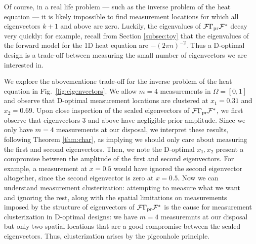 \documentclass[ba]{imsart}
\newcommand{\fwd}{\mathcal{F}}
\theoremstyle{plain}
\theoremstyle{definition}
\theoremstyle{remark}
\begin{document}
Of course, in a real life problem --- such as the inverse problem of
the heat equation --- it is likely impossible to find measurement
locations for which all eigenvectors $k+1$ and above are
zero. Luckily, the eigenvalues of $\fwd\prcov\fwd^*$ decay very
quickly: for example, recall from Section \ref{subsec:toy} that the
eigenvalues of the forward model for the 1D heat equation are $-(2\pi
n)^{-2}$. Thus a D-optimal design is a trade-off between measuring the
small number of eigenvectors we are interested in.

We explore the abovementione trade-off for the inverse problem of the
heat equation in Fig.~\ref{fig:eigenvectors}. We allow $m=4$
measurements in $\Omega = [0,1]$ and observe that D-optimal
measurement locations are clustered at $x_1 = 0.31$ and $x_2 =
0.69$. Upon close inspection of the scaled eigenvectors of $\fwd
\prcov \fwd^*$, we first observe that eigenvectors $3$ and above have
negligible prior amplitude. Since we only have $m=4$ measurements at
our disposal, we interpret these results, following Theorem
\ref{thm:char}, as implying we should only care about measuring the
first and second eigenvectors. Then, we note the D-optimal $x_1,x_2$
present a compromise between the amplitude of the first and second
eigenvectors. For example, a measurement at $x=0.5$ would have ignored
the second eigenvector altogether, since the second eigenvector is
zero at $x=0.5$.  Now we can understand measurement clusterization:
attempting to measure what we want and ignoring the rest, along with
the spatial limitations on measurements imposed by the structure of
eigenvectors of $\fwd \prcov \fwd^*$ is the cause for measurement
clusterization in D-optimal designs: we have $m=4$ measuremnts at our
disposal but only two spatial locations that are a good compromise
between the scaled eigenvectors. Thus, clusterization arises by the
pigeonhole principle.
\end{document}
